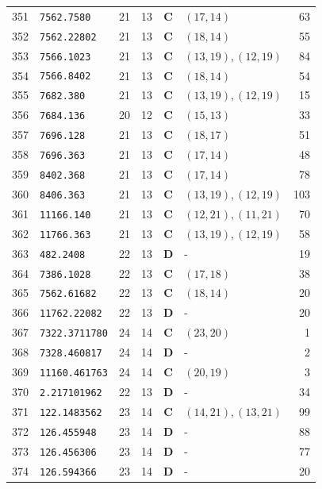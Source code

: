 \documentclass[11pt,a4paper]{article}
\begin{document}
\begin{small}
\begin{longtable}{r l c c c l r}
351 & \texttt{7562.7580} & 21 & 13 & \textbf{C} & $(17,14)$ & 63 \\
352 & \texttt{7562.22802} & 21 & 13 & \textbf{C} & $(18,14)$ & 55 \\
353 & \texttt{7566.1023} & 21 & 13 & \textbf{C} & $(13,19), (12,19)$ & 84 \\
354 & \texttt{7566.8402} & 21 & 13 & \textbf{C} & $(18,14)$ & 54 \\
355 & \texttt{7682.380} & 21 & 13 & \textbf{C} & $(13,19), (12,19)$ & 15 \\
356 & \texttt{7684.136} & 20 & 12 & \textbf{C} & $(15,13)$ & 33 \\
357 & \texttt{7696.128} & 21 & 13 & \textbf{C} & $(18,17)$ & 51 \\
358 & \texttt{7696.363} & 21 & 13 & \textbf{C} & $(17,14)$ & 48 \\
359 & \texttt{8402.368} & 21 & 13 & \textbf{C} & $(17,14)$ & 78 \\
360 & \texttt{8406.363} & 21 & 13 & \textbf{C} & $(13,19), (12,19)$ & 103 \\
361 & \texttt{11166.140} & 21 & 13 & \textbf{C} & $(12,21), (11,21)$ & 70 \\
362 & \texttt{11766.363} & 21 & 13 & \textbf{C} & $(13,19), (12,19)$ & 58 \\
363 & \texttt{482.2408} & 22 & 13 & \textbf{D} & - & 19 \\
364 & \texttt{7386.1028} & 22 & 13 & \textbf{C} & $(17,18)$ & 38 \\
365 & \texttt{7562.61682} & 22 & 13 & \textbf{C} & $(18,14)$ & 20 \\
366 & \texttt{11762.22082} & 22 & 13 & \textbf{D} & - & 20 \\
367 & \texttt{7322.3711780} & 24 & 14 & \textbf{C} & $(23,20)$ & 1 \\
368 & \texttt{7328.460817} & 24 & 14 & \textbf{D} & - & 2 \\
369 & \texttt{11160.461763} & 24 & 14 & \textbf{C} & $(20,19)$ & 3 \\
370 & \texttt{2.217101962} & 22 & 13 & \textbf{D} & - & 34 \\
371 & \texttt{122.1483562} & 23 & 14 & \textbf{C} & $(14,21), (13,21)$ & 99 \\
372 & \texttt{126.455948} & 23 & 14 & \textbf{D} & - & 88 \\
373 & \texttt{126.456306} & 23 & 14 & \textbf{D} & - & 77 \\
374 & \texttt{126.594366} & 23 & 14 & \textbf{D} & - & 20 \\

\end{longtable}
\end{small}
\end{document}
